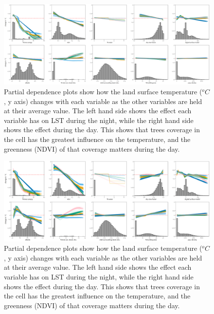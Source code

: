 \documentclass[final,3p,times,twocolumn,sort&compress]{elsarticle}
\begin{document}
\begin{figure}
    \centering
    \includegraphics[width=\linewidth]{fig/report/pdp_uncert_night_100.png}
    \caption{
    Partial dependence plots show how the land surface temperature ($^oC$, y axis) changes with each variable as the other variables are held at their average value. The left hand side shows the effect each variable has on LST during the night, while the right hand side shows the effect during the day. This shows that trees coverage in the cell has the greatest influence on the temperature, and the greenness (NDVI) of that coverage matters during the day.
    }
    \label{fig:pdp_night}
\end{figure}

\begin{figure}
    \centering
    \includegraphics[width=\linewidth]{fig/report/pdp_uncert_day_100.png}
    \caption{
    Partial dependence plots show how the land surface temperature ($^oC$, y axis) changes with each variable as the other variables are held at their average value. The left hand side shows the effect each variable has on LST during the night, while the right hand side shows the effect during the day. This shows that trees coverage in the cell has the greatest influence on the temperature, and the greenness (NDVI) of that coverage matters during the day.
    }
    \label{fig:pdp_day}
\end{figure}
\end{document}
